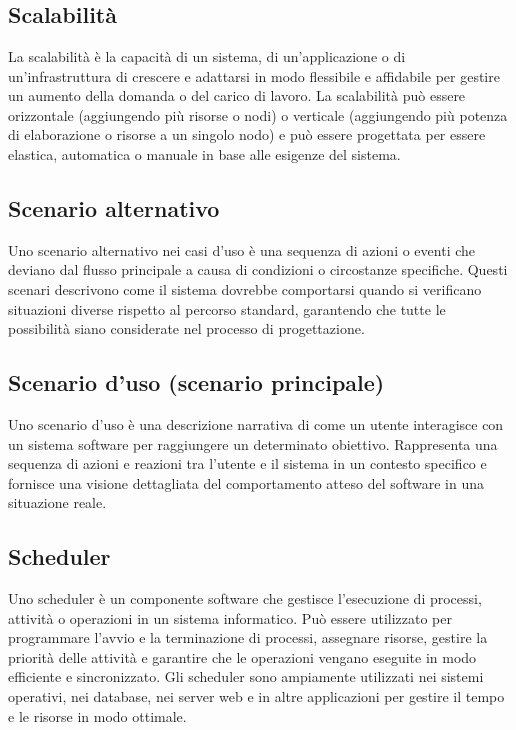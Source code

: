 
\section{}

\hypertarget{sec:scalabilità}{}
\subsection*{Scalabilità}
La scalabilità è la capacità di un sistema, di un'applicazione o di un'infrastruttura di crescere e adattarsi in modo flessibile e affidabile per gestire un
aumento della domanda o del carico di lavoro. La scalabilità può essere orizzontale (aggiungendo più risorse o nodi) o verticale (aggiungendo più potenza
di elaborazione o risorse a un singolo nodo) e può essere progettata per essere elastica, automatica o manuale in base alle esigenze del sistema.

\hypertarget{sec:scenario_alternativo}{}
\subsection*{Scenario alternativo}
Uno scenario alternativo nei casi d'uso è una sequenza di azioni o eventi che deviano dal flusso principale a causa di condizioni o circostanze specifiche. 
Questi scenari descrivono come il sistema dovrebbe comportarsi quando si verificano situazioni diverse rispetto al percorso standard, garantendo che tutte 
le possibilità siano considerate nel processo di progettazione.

\hypertarget{sec:scenario_uso}{}
\subsection*{Scenario d'uso (scenario principale)}
Uno scenario d'uso è una descrizione narrativa di come un utente interagisce con un sistema software per raggiungere un determinato obiettivo. Rappresenta 
una sequenza di azioni e reazioni tra l'utente e il sistema in un contesto specifico e fornisce una visione dettagliata del comportamento atteso del software 
in una situazione reale.

\hypertarget{sec:scheduler}{}
\subsection*{Scheduler}
Uno scheduler è un componente software che gestisce l'esecuzione di processi, attività o operazioni in un sistema informatico. Può essere utilizzato per
programmare l'avvio e la terminazione di processi, assegnare risorse, gestire la priorità delle attività e garantire che le operazioni vengano eseguite in
modo efficiente e sincronizzato. Gli scheduler sono ampiamente utilizzati nei sistemi operativi, nei database, nei server web e in altre applicazioni per
gestire il tempo e le risorse in modo ottimale.

